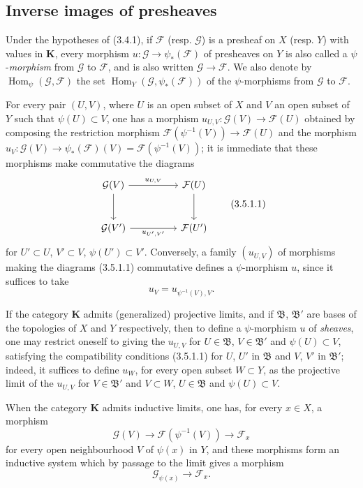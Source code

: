 \subsection{Inverse images of presheaves}

\begin{env}[3.5.1]
\label{0.3.5.1}
Under the hypotheses of (3.4.1), if $\mathcal{F}$ (resp. $\mathcal{G}$) is a
presheaf on $X$ (resp. $Y$) with values in $\boldsymbol{K}$, every morphism
$u:\mathcal{G}\to\psi_*(\mathcal{F})$ of presheaves on $Y$ is also called
a $\psi$-\emph{morphism} from $\mathcal{G}$ to $\mathcal{F}$, and is
also written $\mathcal{G}\to\mathcal{F}$. We also denote by
$\operatorname{Hom}_\psi(\mathcal{G},\mathcal{F})$ the set
$\operatorname{Hom}_Y(\mathcal{G},\psi_*(\mathcal{F}))$ of the
$\psi$-morphisms from $\mathcal{G}$ to $\mathcal{F}$.

For every pair $(U,V)$, where $U$ is an open subset of $X$ and $V$ an open subset of $Y$
such that $\psi(U)\subset V$, one has a morphism
$u_{U,V}:\mathcal{G}(V)\to\mathcal{F}(U)$ obtained by composing the restriction
morphism
$\mathcal{F}(\psi^{-1}(V))\to\mathcal{F}(U)$ and the morphism
$u_V:\mathcal{G}(V)\to\psi_*(\mathcal{F})(V)=\mathcal{F}(\psi^{-1}(V))$; it
is immediate that these morphisms make commutative the diagrams
\begin{equation*}
\begin{tikzcd}[column sep=huge,row sep=large]
\mathcal{G}(V) \arrow[r,"u_{U,V}"] \arrow[d]
  & \mathcal{F}(U) \arrow[d] \\
\mathcal{G}(V') \arrow[r,"u_{U',V'}"']
  & \mathcal{F}(U')
\end{tikzcd}
\tag{3.5.1.1}\label{0.3.5.1.1}
\end{equation*}
for $U'\subset U$, $V'\subset V$, $\psi(U')\subset V'$. Conversely, a
family $(u_{U,V})$ of morphisms making the
diagrams (3.5.1.1) commutative defines a $\psi$-morphism $u$, since it suffices to take
\[
  u_V=u_{\psi^{-1}(V),V}.
\]


If the category $\boldsymbol{K}$ admits (generalized) projective limits, and
if $\mathfrak{B}$, $\mathfrak{B}'$ are bases of the topologies of $X$ and
$Y$ respectively, then to define a $\psi$-morphism $u$ of \emph{sheaves},
one may restrict oneself to giving the $u_{U,V}$ for
$U\in\mathfrak{B}$, $V\in\mathfrak{B}'$ and $\psi(U)\subset V$, satisfying the
compatibility conditions (3.5.1.1) for $U$, $U'$ in $\mathfrak{B}$ and
$V$, $V'$ in $\mathfrak{B}'$; indeed, it suffices to define $u_W$, for
every open subset $W\subset Y$, as the projective limit of the $u_{U,V}$ for
$V\in\mathfrak{B}'$ and $V\subset W$, $U\in\mathfrak{B}$ and
$\psi(U)\subset V$.

When the category $\boldsymbol{K}$ admits inductive limits, one has, for
every $x\in X$, a morphism
\[
  \mathcal{G}(V)\to\mathcal{F}(\psi^{-1}(V))\to\mathcal{F}_x
\]
for every open neighbourhood $V$ of $\psi(x)$ in $Y$, and these morphisms
form an inductive system which by passage to the limit gives a morphism
\[
  \mathcal{G}_{\psi(x)}\to\mathcal{F}_x.
\]
\end{env}

